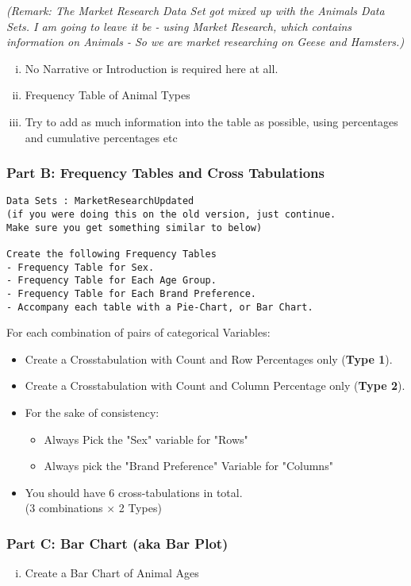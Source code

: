 \documentclass[a4paper,12pt]{article}
\begin{document}
\textit{(Remark: The Market Research Data Set got mixed up with the Animals Data Sets. I am going to leave it be - using Market Research, which contains information on Animals - So we are market researching on Geese and Hamsters.)}
\begin{enumerate}[(i)]
	\item No Narrative or Introduction is required here at all.
	\item Frequency Table of Animal Types
	\item Try to add as much information into the table as possible, using percentages and cumulative percentages etc
\end{enumerate}


\subsubsection*{Part B: Frequency Tables and Cross Tabulations }
\begin{verbatim}
Data Sets : MarketResearchUpdated 
(if you were doing this on the old version, just continue. 
Make sure you get something similar to below)

Create the following Frequency Tables
- Frequency Table for Sex.
- Frequency Table for Each Age Group.
- Frequency Table for Each Brand Preference.
- Accompany each table with a Pie-Chart, or Bar Chart.
\end{verbatim}
For each combination of pairs of categorical Variables:

\begin{itemize}
\item Create a Crosstabulation with Count and Row Percentages only (\textbf{Type 1}).
\item Create a Crosstabulation with Count and Column Percentage only (\textbf{Type 2}).
\item For the sake of consistency: 
\begin{itemize}
	\item Always Pick the "Sex" variable for "Rows"
	\item Always pick the "Brand Preference" Variable for "Columns"
\end{itemize}
     
\item You should have 6 cross-tabulations in total.\\ (3 combinations $\times$ 2 Types)
\end{itemize}
\subsubsection*{Part C: Bar Chart (aka Bar Plot)}
\begin{enumerate}[(i)]
	\item Create a Bar Chart of Animal Ages
\end{enumerate}
\bigskip
\end{document}
